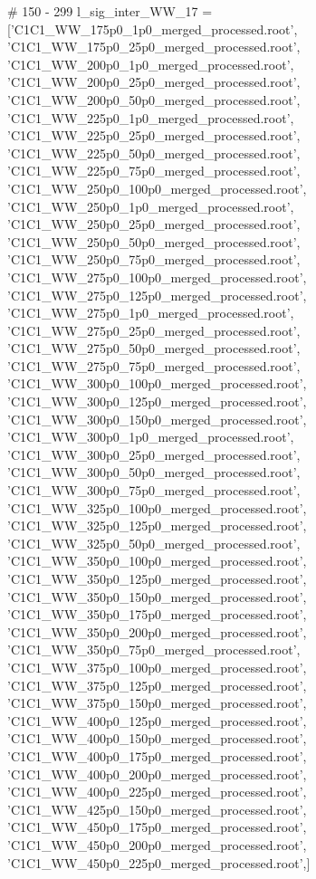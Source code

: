 # 150 - 299
l_sig_inter_WW_17 = ['C1C1_WW_175p0_1p0_merged_processed.root',
'C1C1_WW_175p0_25p0_merged_processed.root',
'C1C1_WW_200p0_1p0_merged_processed.root',
'C1C1_WW_200p0_25p0_merged_processed.root',
'C1C1_WW_200p0_50p0_merged_processed.root',
'C1C1_WW_225p0_1p0_merged_processed.root',
'C1C1_WW_225p0_25p0_merged_processed.root',
'C1C1_WW_225p0_50p0_merged_processed.root',
'C1C1_WW_225p0_75p0_merged_processed.root',
'C1C1_WW_250p0_100p0_merged_processed.root',
'C1C1_WW_250p0_1p0_merged_processed.root',
'C1C1_WW_250p0_25p0_merged_processed.root',
'C1C1_WW_250p0_50p0_merged_processed.root',
'C1C1_WW_250p0_75p0_merged_processed.root',
'C1C1_WW_275p0_100p0_merged_processed.root',
'C1C1_WW_275p0_125p0_merged_processed.root',
'C1C1_WW_275p0_1p0_merged_processed.root',
'C1C1_WW_275p0_25p0_merged_processed.root',
'C1C1_WW_275p0_50p0_merged_processed.root',
'C1C1_WW_275p0_75p0_merged_processed.root',
'C1C1_WW_300p0_100p0_merged_processed.root',
'C1C1_WW_300p0_125p0_merged_processed.root',
'C1C1_WW_300p0_150p0_merged_processed.root',
'C1C1_WW_300p0_1p0_merged_processed.root',
'C1C1_WW_300p0_25p0_merged_processed.root',
'C1C1_WW_300p0_50p0_merged_processed.root',
'C1C1_WW_300p0_75p0_merged_processed.root',
'C1C1_WW_325p0_100p0_merged_processed.root',
'C1C1_WW_325p0_125p0_merged_processed.root',
'C1C1_WW_325p0_50p0_merged_processed.root',
'C1C1_WW_350p0_100p0_merged_processed.root',
'C1C1_WW_350p0_125p0_merged_processed.root',
'C1C1_WW_350p0_150p0_merged_processed.root',
'C1C1_WW_350p0_175p0_merged_processed.root',
'C1C1_WW_350p0_200p0_merged_processed.root',
'C1C1_WW_350p0_75p0_merged_processed.root',
'C1C1_WW_375p0_100p0_merged_processed.root',
'C1C1_WW_375p0_125p0_merged_processed.root',
'C1C1_WW_375p0_150p0_merged_processed.root',
'C1C1_WW_400p0_125p0_merged_processed.root',
'C1C1_WW_400p0_150p0_merged_processed.root',
'C1C1_WW_400p0_175p0_merged_processed.root',
'C1C1_WW_400p0_200p0_merged_processed.root',
'C1C1_WW_400p0_225p0_merged_processed.root',
'C1C1_WW_425p0_150p0_merged_processed.root',
'C1C1_WW_450p0_175p0_merged_processed.root',
'C1C1_WW_450p0_200p0_merged_processed.root',
'C1C1_WW_450p0_225p0_merged_processed.root',]

